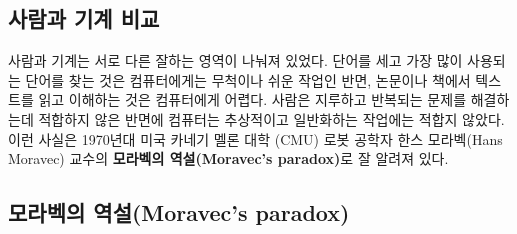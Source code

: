 \documentclass[smallextended]{svjour3}       %
\begin{document}
\hypertarget{man-human-comparison}{%
\subsection{사람과 기계 비교}\label{man-human-comparison}}

사람과 기계는 서로 다른 잘하는 영역이 나눠져 있었다. 단어를 세고 가장
많이 사용되는 단어를 찾는 것은 컴퓨터에게는 무척이나 쉬운 작업인 반면,
논문이나 책에서 텍스트를 읽고 이해하는 것은 컴퓨터에게 어렵다. 사람은
지루하고 반복되는 문제를 해결하는데 적합하지 않은 반면에 컴퓨터는
추상적이고 일반화하는 작업에는 적합지 않았다. 이런 사실은 1970년대 미국
카네기 멜론 대학 (CMU) 로봇 공학자 한스 모라벡(Hans Moravec) 교수의
\textbf{모라벡의 역설(Moravec's paradox)}로 잘 알려져 있다.

\begin{table}[H]
\centering
{}
\end{table}

\hypertarget{uxbaa8uxb77cuxbca1uxc758-uxc5eduxc124moravecs-paradox}{%
\subsection{모라벡의 역설(Moravec's
paradox)}\label{uxbaa8uxb77cuxbca1uxc758-uxc5eduxc124moravecs-paradox}}
\end{document}
